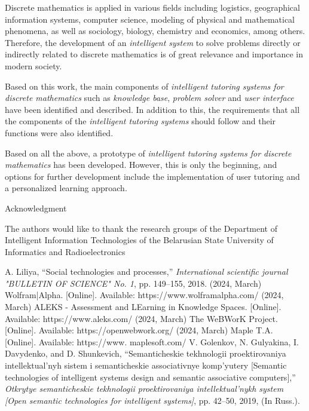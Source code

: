 \documentclass[10pt, a4paper]{article}
\begin{document}
\begin{multicols}{2}
\par Discrete mathematics is applied in various fields including logistics, geographical information systems, computer science, modeling of physical and mathematical phenomena, as well as sociology, biology, chemistry and economics, among others. Therefore, the development of an \textit{intelligent system} to solve problems directly or indirectly related to discrete mathematics is of great relevance and importance in modern society.\par Based on this work, the main components of \textit{intelligent tutoring systems for discrete mathematics} such as \textit{knowledge base},\textit{ problem solver} and \textit{user interface} have been identified and described. In addition to this, the requirements that all the components of the \textit{intelligent tutoring systems} should follow and their functions were also identified.\par Based on all the above, a prototype of \textit{intelligent tutoring systems for discrete mathematics} has been developed. However, this is only the beginning, and options for further development include the implementation of user tutoring and a personalized learning approach. 
\begin{center}
    Acknowledgment
\end{center}
\par The authors would like to thank the research groups of the Department of Intelligent Information Technologies of the Belarusian State University of Informatics and Radioelectronics
\begin{thebibliography}{196}
\setlength{\parskip}{0pt}
\setlength{\itemsep}{0pt}
\scriptsize
\bibitem  A. Liliya, “Social technologies and processes,” \textit{International scientific journal "BULLETIN OF SCIENCE" No. 1}, pp. 149–155, 2018.
\bibitem (2024, March) Wolfram|Alpha. [Online]. Available: https://www.wolframalpha.com/
\bibitem (2024, March) ALEKS - Assessment and LEarning in Knowledge Spaces. [Online]. Available: https://www.aleks.com/
\bibitem(2024, March) The WeBWorK Project. [Online]. Available: https://openwebwork.org/
\bibitem(2024, March) Maple T.A. [Online]. Available: https://www. maplesoft.com/
\bibitem V. Golenkov, N. Gulyakina, I. Davydenko, and D. Shunkevich, “Semanticheskie tekhnologii proektirovaniya intellektual’nyh sistem i semanticheskie associativnye komp’yutery [Semantic technologies of intelligent systems design and semantic associative computers],” \textit{Otkrytye semanticheskie tekhnologii proektirovaniya intellektual’nykh system [Open semantic technologies for intelligent systems]}, pp. 42–50, 2019, (In Russ.).

\end{thebibliography}
\end{multicols}
\end{document}
